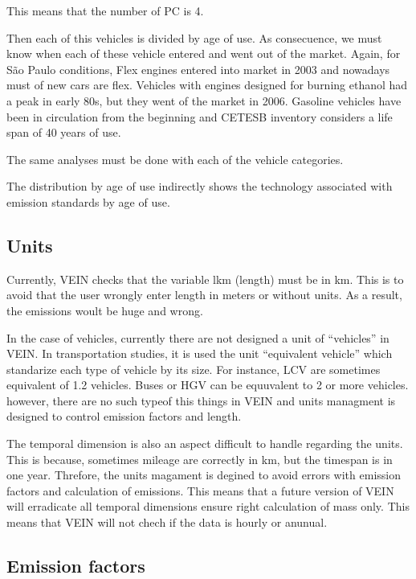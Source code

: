 \documentclass[12pt,graybox,envcountchap,sectrefs]{krantz}
\theoremstyle{definition}
\theoremstyle{definition}
\theoremstyle{definition}
\theoremstyle{remark}
\begin{document}
This means that the number of PC is 4.

Then each of this vehicles is divided by age of use. As consecuence, we
must know when each of these vehicle entered and went out of the market.
Again, for São Paulo conditions, Flex engines entered into market in
2003 and nowadays must of new cars are flex. Vehicles with engines
designed for burning ethanol had a peak in early 80s, but they went of
the market in 2006. Gasoline vehicles have been in circulation from the
beginning and CETESB inventory considers a life span of 40 years of use.

The same analyses must be done with each of the vehicle categories.

The distribution by age of use indirectly shows the technology
associated with emission standards by age of use.

\subsection{Units}\label{units}

Currently, VEIN checks that the variable lkm (length) must be in km.
This is to avoid that the user wrongly enter length in meters or without
units. As a result, the emissions woult be huge and wrong.

In the case of vehicles, currently there are not designed a unit of
``vehicles'' in VEIN. In transportation studies, it is used the unit
``equivalent vehicle'' which standarize each type of vehicle by its
size. For instance, LCV are sometimes equivalent of 1.2 vehicles. Buses
or HGV can be equuvalent to 2 or more vehicles. however, there are no
such typeof this things in VEIN and units managment is designed to
control emission factors and length.

The temporal dimension is also an aspect difficult to handle regarding
the units. This is because, sometimes mileage are correctly in km, but
the timespan is in one year. Threfore, the units magament is degined to
avoid errors with emission factors and calculation of emissions. This
means that a future version of VEIN will erradicate all temporal
dimensions ensure right calculation of mass only. This means that VEIN
will not chech if the data is hourly or anunual.

\subsection{Emission factors}\label{emission-factors-1}
\end{document}
